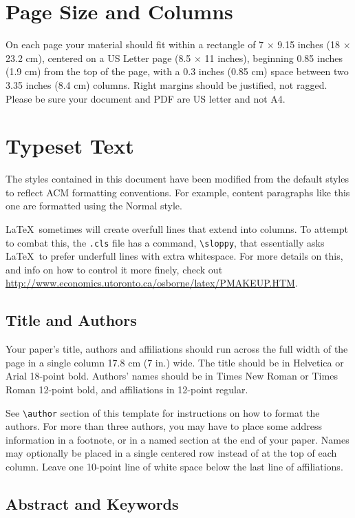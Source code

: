 \documentclass{sigchi}
\begin{document}
\section{Page Size and Columns}
On each page your material should fit within a rectangle of 7 $\times$
9.15 inches (18 $\times$ 23.2 cm), centered on a US Letter page (8.5
$\times$ 11 inches), beginning 0.85 inches (1.9 cm) from the top of
the page, with a 0.3 inches (0.85 cm) space between two 3.35 inches
(8.4 cm) columns. Right margins should be justified, not
ragged. Please be sure your document and PDF are US letter and not A4.

\section{Typeset Text}
The styles contained in this document have been modified from the
default styles to reflect ACM formatting conventions. For example,
content paragraphs like this one are formatted using the Normal style.

\LaTeX\ sometimes will create overfull lines that extend into columns.
To attempt to combat this, the \texttt{.cls} file has a command,
\texttt{{\textbackslash}sloppy}, that essentially asks \LaTeX\ to
prefer underfull lines with extra whitespace.  For more details on
this, and info on how to control it more finely, check out
{\url{http://www.economics.utoronto.ca/osborne/latex/PMAKEUP.HTM}}.

\subsection{Title and Authors}

Your paper's title, authors and affiliations should run across the
full width of the page in a single column 17.8 cm (7 in.) wide.  The
title should be in Helvetica or Arial 18-point bold.  Authors' names
should be in Times New Roman or Times Roman 12-point bold, and
affiliations in 12-point regular.  

See \texttt{{\textbackslash}author} section of this template for
instructions on how to format the authors. For more than three
authors, you may have to place some address information in a footnote,
or in a named section at the end of your paper. Names may optionally
be placed in a single centered row instead of at the top of each
column. Leave one 10-point line of white space below the last line of
affiliations.

\subsection{Abstract and Keywords}
\end{document}
